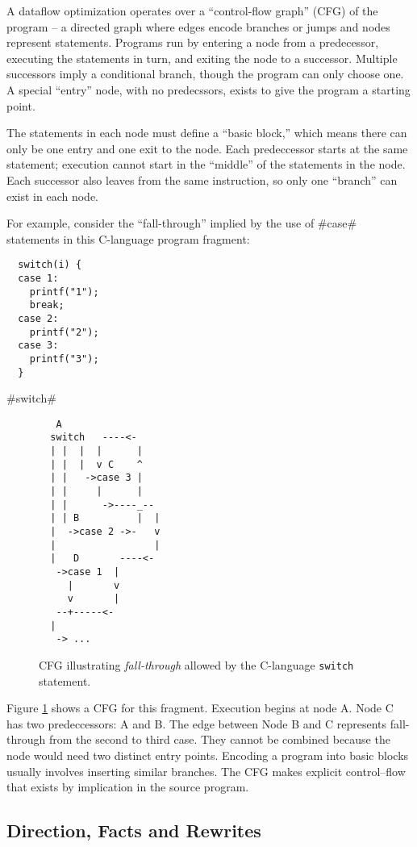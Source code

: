 \documentclass[12pt]{report}
\begin{document}
A dataflow optimization operates over a ``control-flow graph'' (CFG)
of the program -- a directed graph where edges encode branches or
jumps and nodes represent statements. Programs run by entering a node
from a predecessor, executing the statements in turn, and exiting the
node to a successor. Multiple successors imply a conditional branch,
though the program can only choose one. A special ``entry'' node, with
no predecssors, exists to give the program a starting point.

The statements in each node must define a ``basic block,'' which means
there can only be one entry and one exit to the node. Each 
predeccessor starts at the same statement; execution cannot start in
the ``middle'' of the statements in the node. Each successor also
leaves from the same instruction, so only one ``branch'' can exist in
each node.

For example, consider the ``fall-through'' implied by the use of #case#
statements in this C-language program fragment:

\begin{verbatim}
  switch(i) {
  case 1:
    printf("1");
    break;
  case 2:
    printf("2");
  case 3:
    printf("3");
  }
\end{verbatim}

#switch#

\begin{figure}[h]
\begin{verbatim}
   A
  switch   ----<-
  | |  |  |      |
  | |  |  v C    ^
  | |   ->case 3 |
  | |     |      |
  | |      ->----_-- 
  | | B          |  |
  |  ->case 2 ->-   v
  |                 |
  |   D       ----<-
   ->case 1  |
     |       v
     v       |
   --+-----<-      
  |  
   -> ...
\end{verbatim}
\caption{CFG illustrating \emph{fall-through} allowed by the
  C-language \texttt{switch} statement.}
\label{switchCfgEg}
\end{figure}

Figure \ref{switchCfgEg} shows a CFG for this fragment. Execution
begins at node A. Node C has two predeccessors: A and B. The edge
between Node B and C represents fall-through from the second to third
case. They cannot be combined because the node would need two distinct
entry points. Encoding a program into basic blocks usually involves
inserting similar branches. The CFG makes explicit control--flow that
exists by implication in the source program.

\subsection{Direction, Facts and Rewrites}
\end{document}
